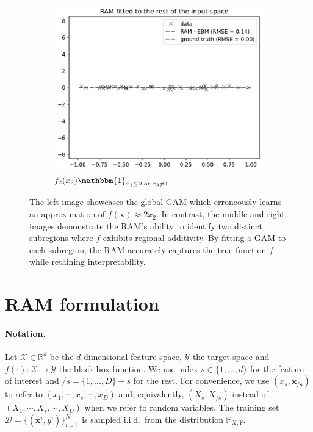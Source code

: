 \documentclass[runningheads]{llncs}
\newcommand{\Rd}{\mathbb{R}^d}
\newcommand{\xb}{\mathbf{x}}
\newcommand{\xcc}{\mathbf{x_{/s}}}
\newcommand{\Xcal}{\mathcal{X}}
\newcommand{\Ycal}{\mathcal{Y}}
\newcommand{\when}[1]{\mathbbm{1}_{#1}}
\begin{document}
\begin{figure}[htbp]
\begin{subfigure}{0.32\textwidth}
    \end{subfigure}
    \begin{subfigure}{0.32\textwidth}
        \centering
        \includegraphics[width=\textwidth]{figures/regional_gam_subreg_2}
        \caption{\(f_2(x_2) \when{x_1 \leq 0 \text{ or } x_3 \neq 1}\)}
        \label{subfig:regional_gam_2}
    \end{subfigure}
    \caption{The left image showcases the global GAM which erroneously learns an approximation of \(f(\xb) \approx 2x_2\).
    In contrast, the middle and right images demonstrate the RAM's ability to identify two distinct subregions where \(f\) exhibits regional additivity.
    By fitting a GAM to each subregion, the RAM accurately captures the true function $f$ while retaining interpretability.}
    \label{fig:ram_example}
\end{figure}


\section{RAM formulation}
\label{sec:ram_formulation}

\paragraph{Notation.}
Let \(\Xcal \in \Rd\) be the \(d\)-dimensional feature space, \(\Ycal\) the target space and \(f(\cdot) : \Xcal \rightarrow \Ycal\) the black-box function.
We use index \(s \in \{1, \ldots, d\}\) for the feature of interest and \(/s = \{1, \ldots, D\} - s\) for the rest.
For convenience, we use \((x_s, \xcc)\) to refer to \((x_1, \cdots , x_s, \cdots, x_D)\) and, equivalently, \((X_s, X_{/s})\) instead of \((X_1, \cdots , X_s, \cdots, X_D)\) when we refer to random variables.
The training set \(\mathcal{D} = \{(\xb^i, y^i)\}_{i=1}^N\) is sampled
i.i.d.\ from the distribution \(\mathbb{P}_{X,Y}\).
\end{document}
